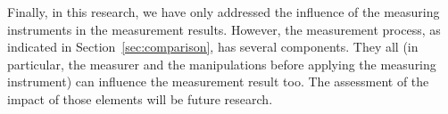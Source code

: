 Finally, in this research, we have only addressed the influence of the measuring instruments in the measurement results. However, the measurement process, as indicated in Section~\ref{sec:comparison}, has several components. They all (in particular, the measurer and the manipulations before applying the measuring instrument) can influence the measurement result too. The assessment of the impact of those elements will be future research.